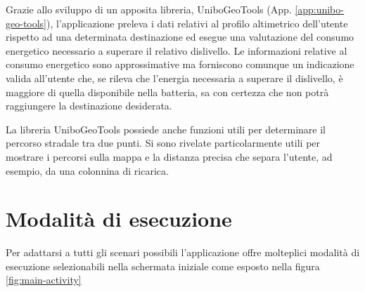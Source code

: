 Grazie allo sviluppo di un apposita libreria, UniboGeoTools (App. \ref{app:unibo-geo-tools}), l'applicazione preleva i dati relativi al profilo altimetrico dell'utente rispetto ad una determinata destinazione ed esegue una valutazione del consumo energetico necessario a superare il relativo dislivello. Le informazioni relative al consumo energetico sono approssimative ma forniscono comunque un indicazione valida all'utente che, se rileva che l'energia necessaria a superare il dislivello, è maggiore di quella disponibile nella batteria, sa con certezza che non potrà raggiungere la destinazione desiderata.

La libreria UniboGeoTools possiede anche funzioni utili per determinare il percorso stradale tra due punti. Si sono rivelate particolarmente utili per mostrare i percorsi sulla mappa e la distanza precisa che separa l'utente, ad esempio, da una colonnina di ricarica.


\section{Modalità di esecuzione}

Per adattarsi a tutti gli scenari possibili l'applicazione offre molteplici modalità di esecuzione selezionabili nella schermata iniziale come esposto nella figura \ref{fig:main-activity}

